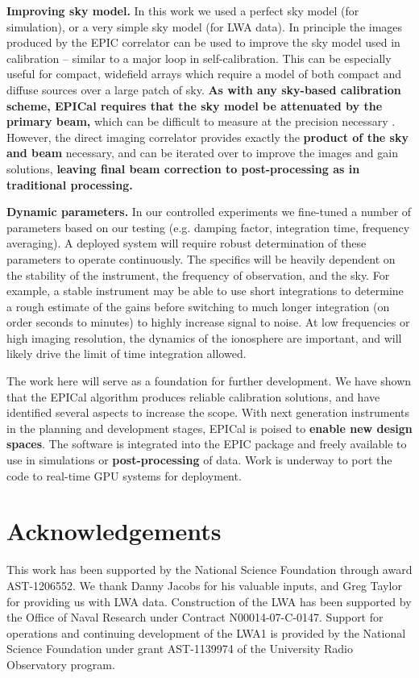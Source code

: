 \documentclass[a4paper,fleqn,usenatbib]{../mnras}
\begin{document}
\textbf{Improving sky model.} In this work we used a perfect sky model (for simulation), or a 
very simple sky model (for LWA data). In principle the images produced by the EPIC correlator 
can be used to improve the sky model used in calibration -- similar to a major loop in 
self-calibration. This can be especially useful for compact, widefield arrays which require a model of 
both compact and diffuse sources over a large patch of sky. 
\textbf{As with any sky-based calibration scheme, EPICal requires that the sky model be attenuated
by the primary beam,} which 
can be difficult to measure at the precision necessary \citep[e.g.][]{neb15,vir14,thy15b}. 
However, the direct imaging correlator provides exactly the \textbf{product of the sky and beam} necessary, and 
can be iterated over to improve the images and gain solutions, \textbf{leaving final beam
correction to post-processing as in traditional processing.}

\textbf{Dynamic parameters.} In our controlled experiments we fine-tuned a number of 
parameters based on our testing (e.g. damping factor, integration time, frequency averaging). A 
deployed system will require robust determination of these parameters to operate continuously. 
The specifics will be heavily dependent on the stability of the instrument, the frequency of 
observation, and the sky. For example, a stable instrument may be able to use short 
integrations to determine a rough estimate of the gains before switching to much longer 
integration (on order seconds to minutes) to highly increase signal to noise. At low frequencies 
or high imaging resolution, the dynamics of the ionosphere are important, and will likely drive 
the limit of time integration allowed.

The work here will serve as a foundation for further development. We have shown that the 
EPICal algorithm produces reliable calibration solutions, and have identified several aspects to 
increase the scope. With next generation instruments in the planning and development stages, 
EPICal is poised to \textbf{enable new design spaces}. The software is integrated into the EPIC 
package and freely available to use in simulations or \textbf{post-processing} of data. Work is 
underway to port the code to real-time GPU systems for deployment. 

\section*{Acknowledgements}
This work has been supported by the National Science Foundation through award 
AST-1206552. We thank Danny Jacobs for his valuable inputs, and Greg Taylor for providing 
us with LWA data. Construction of the LWA has been supported by the Office of Naval 
Research under Contract N00014-07-C-0147. Support for operations and continuing 
development of the LWA1 is provided by the National Science Foundation under grant 
AST-1139974 of the University Radio Observatory program.
\end{document}
